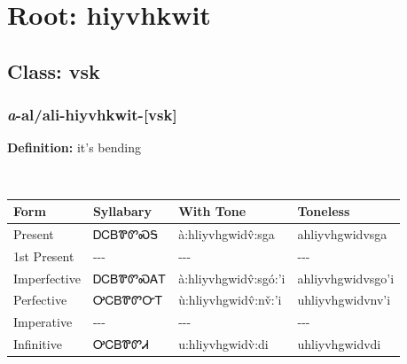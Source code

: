 \needspace{4in}
\section*{Root: hiyvhkwit}
\nopagebreak
{}
\needspace{3in}
\subsection*{Class: vsk}
\nopagebreak
\needspace{2in}
\subsubsection*{\textit{a}{-}al/ali{-}\textbf{hiyvhkwit}{-}[vsk]}
\nopagebreak
\textbf{Definition: } it{\textquoteright}s bending
\\[0.5em]
\begin{tabularx}{\textwidth}{l X X X}%
\toprule%
\textbf{Form}&\textbf{Syllabary}&\textbf{With Tone}&\textbf{Toneless}\\%
\midrule%
Present&ᎠᏟᏴᏈᏛᏍᎦ&à:hliyvhgwidv̂:sga&ahliyvhgwidvsga\\%
1st Present&{-}{-}{-}&{-}{-}{-}&{-}{-}{-}\\%
Imperfective&ᎠᏟᏴᏈᏛᏍᎪᎢ&à:hliyvhgwidv̂:sgó:’i&ahliyvhgwidvsgo’i\\%
Perfective&ᎤᏟᏴᏈᏛᏅᎢ&ù:hliyvhgwidv̂:nv̌:’i&uhliyvhgwidvnv’i\\%
Imperative&{-}{-}{-}&{-}{-}{-}&{-}{-}{-}\\%
Infinitive&ᎤᏟᏴᏈᏛᏗ&u:hliyvhgwidv̀:di&uhliyvhgwidvdi\\%
\bottomrule%
\end{tabularx}
\\[1em]